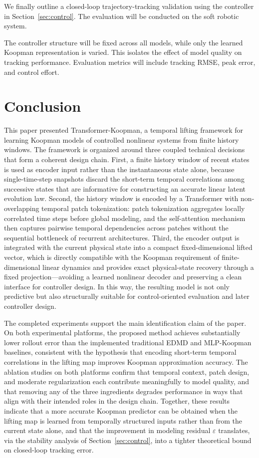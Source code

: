 \documentclass[journal]{IEEEtran}
\begin{document}
We finally outline a closed-loop trajectory-tracking validation using the controller in Section~\ref{sec:control}. The evaluation will be conducted on the soft robotic system.

The controller structure will be fixed across all models, while only the learned Koopman representation is varied. This isolates the effect of model quality on tracking performance. Evaluation metrics will include tracking RMSE, peak error, and control effort.


\section{Conclusion}
\label{sec:conclusion}

This paper presented Transformer-Koopman, a temporal lifting framework for learning Koopman models of controlled nonlinear systems from finite history windows. The framework is organized around three coupled technical decisions that form a coherent design chain. First, a finite history window of recent states is used as encoder input rather than the instantaneous state alone, because single-time-step snapshots discard the short-term temporal correlations among successive states that are informative for constructing an accurate linear latent evolution law. Second, the history window is encoded by a Transformer with non-overlapping temporal patch tokenization: patch tokenization aggregates locally correlated time steps before global modeling, and the self-attention mechanism then captures pairwise temporal dependencies across patches without the sequential bottleneck of recurrent architectures. Third, the encoder output is integrated with the current physical state into a compact fixed-dimensional lifted vector, which is directly compatible with the Koopman requirement of finite-dimensional linear dynamics and provides exact physical-state recovery through a fixed projection---avoiding a learned nonlinear decoder and preserving a clean interface for controller design. In this way, the resulting model is not only predictive but also structurally suitable for control-oriented evaluation and later controller design.

The completed experiments support the main identification claim of the paper. On both experimental platforms, the proposed method achieves substantially lower rollout error than the implemented traditional EDMD and MLP-Koopman baselines, consistent with the hypothesis that encoding short-term temporal correlations in the lifting map improves Koopman approximation accuracy. The ablation studies on both platforms confirm that temporal context, patch design, and moderate regularization each contribute meaningfully to model quality, and that removing any of the three ingredients degrades performance in ways that align with their intended roles in the design chain. Together, these results indicate that a more accurate Koopman predictor can be obtained when the lifting map is learned from temporally structured inputs rather than from the current state alone, and that the improvement in modeling residual $\varepsilon$ translates, via the stability analysis of Section~\ref{sec:control}, into a tighter theoretical bound on closed-loop tracking error.
\end{document}
